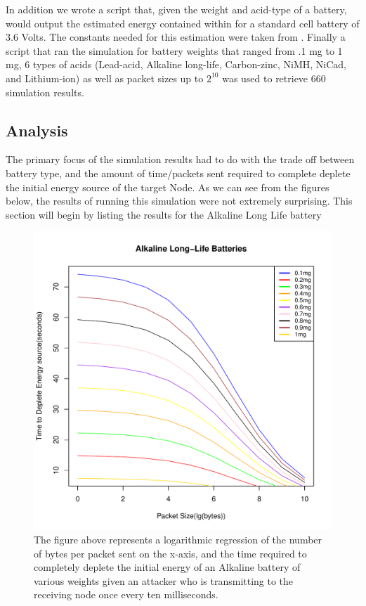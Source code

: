 In addition we wrote a script that, given the weight and acid-type of a battery, would output the estimated energy contained within for
a standard cell battery of 3.6 Volts. The constants needed for this estimation were taken from \cite{Doe:2009:Misc}. Finally a script that 
ran the simulation for battery weights that ranged from .1 mg to 1 mg, 6 types of acids (Lead-acid, Alkaline long-life, Carbon-zinc, 
NiMH, NiCad, and Lithium-ion) as well as packet sizes up to $2^{10}$ was used to retrieve 660 simulation results. 

\subsection{Analysis}
The primary focus of the simulation results had to do with the trade off between battery type, and the amount of time/packets sent
required to complete deplete the initial energy source of the target Node. As we can see from the figures below, the results of running this simulation were not extremely surprising. This section will begin by listing the results for the Alkaline Long Life battery

\begin{figure}[h!]
\centering
{}
\includegraphics[width=\linewidth]{Figures/BatteryDeplition/ALLibat.pdf}
\caption{The figure above represents a logarithmic regression of the number of bytes per packet sent on the x-axis, and the time required to completely deplete the initial energy of an Alkaline battery of various weights given an attacker who is transmitting to the receiving node once every ten milliseconds.}
\end{figure}

